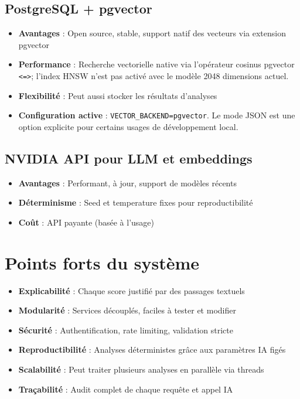 \documentclass[12pt,a4paper,oneside]{book}
\begin{document}
\subsection{PostgreSQL + pgvector}

\begin{itemize}
    \item \textbf{Avantages} : Open source, stable, support natif des vecteurs via extension pgvector
    \item \textbf{Performance} : Recherche vectorielle native via l'opérateur cosinus pgvector \texttt{<=>}; l'index HNSW n'est pas activé avec le modèle 2048 dimensions actuel.
    \item \textbf{Flexibilité} : Peut aussi stocker les résultats d'analyses
    \item \textbf{Configuration active} : \texttt{VECTOR\_BACKEND=pgvector}. Le mode JSON est une option explicite pour certains usages de développement local.
\end{itemize}

\subsection{NVIDIA API pour LLM et embeddings}

\begin{itemize}
    \item \textbf{Avantages} : Performant, à jour, support de modèles récents
    \item \textbf{Déterminisme} : Seed et temperature fixes pour reproductibilité
    \item \textbf{Coût} : API payante (basée à l'usage)
\end{itemize}

\section{Points forts du système}

\begin{itemize}
    \item \textbf{Explicabilité} : Chaque score justifié par des passages textuels
    \item \textbf{Modularité} : Services découplés, faciles à tester et modifier
    \item \textbf{Sécurité} : Authentification, rate limiting, validation stricte
    \item \textbf{Reproductibilité} : Analyses déterministes grâce aux paramètres IA figés
    \item \textbf{Scalabilité} : Peut traiter plusieurs analyses en parallèle via threads
    \item \textbf{Traçabilité} : Audit complet de chaque requête et appel IA
\end{itemize}
\end{document}
